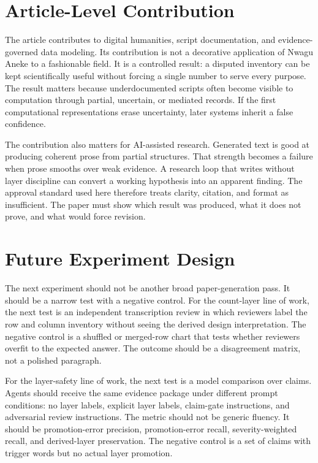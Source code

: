 \documentclass[sigconf,nonacm]{acmart}
\begin{document}
\section{Article-Level Contribution}
The article contributes to digital humanities, script documentation, and evidence-governed data modeling. Its contribution is not a decorative
application of Nwagu Aneke to a fashionable field. It is a controlled result:
a disputed inventory can be kept scientifically useful without forcing a single number to serve every purpose. The result matters because underdocumented scripts often become
visible to computation through partial, uncertain, or mediated records. If the
first computational representations erase uncertainty, later systems inherit a
false confidence.

The contribution also matters for AI-assisted research. Generated text is good
at producing coherent prose from partial structures. That strength becomes a
failure when prose smooths over weak evidence. A research loop that writes
without layer discipline can convert a working hypothesis into an apparent
finding. The approval standard used here therefore treats clarity, citation, and
format as insufficient. The paper must show which result was produced, what it
does not prove, and what would force revision.

\section{Future Experiment Design}
The next experiment should not be another broad paper-generation pass. It should
be a narrow test with a negative control. For the count-layer line of work, the
next test is an independent transcription review in which reviewers label the
row and column inventory without seeing the derived design interpretation. The
negative control is a shuffled or merged-row chart that tests whether reviewers
overfit to the expected answer. The outcome should be a disagreement matrix,
not a polished paragraph.

For the layer-safety line of work, the next test is a model comparison over
claims. Agents should receive the same evidence package under different prompt
conditions: no layer labels, explicit layer labels, claim-gate instructions, and
adversarial review instructions. The metric should not be generic fluency. It
should be promotion-error precision, promotion-error recall, severity-weighted
recall, and derived-layer preservation. The negative control is a set of claims
with trigger words but no actual layer promotion.
\end{document}
